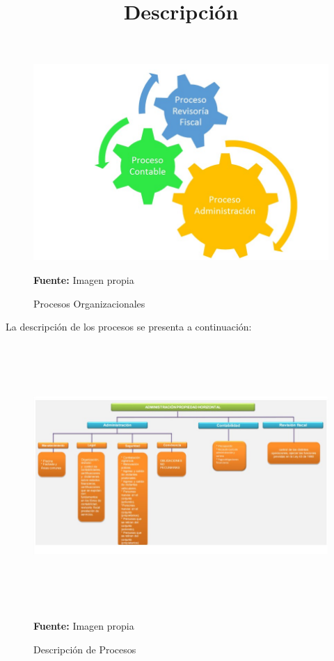 \begin{figure}[h!]
	\centering
	\includegraphics[width=0.7\linewidth]{arquitectura/organizacion/imgs/procesos_org1}
	\caption{Procesos Organizacionales} {\scriptsize \textbf{Fuente:} Imagen propia}
\end{figure}

\title{Descripción}

La descripción de los procesos se presenta a continuación:

\begin{figure}[h!]
	\centering
	\includegraphics[width=16cm,height=10cm]{arquitectura/organizacion/imgs/procesos_org2}
	\caption{Descripción de Procesos} {\scriptsize \textbf{Fuente:} Imagen propia}	
\end{figure}

